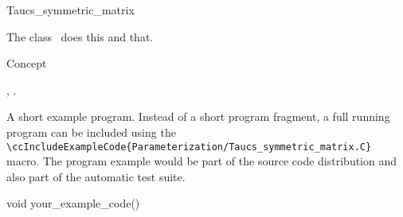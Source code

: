 

\begin{ccRefClass}{Taucs_symmetric_matrix}  %


\ccDefinition
  
The class \ccRefName\ does this and that.


\ccIsModel

Concept

\ccTypes


\ccCreation
{}  %


\ccOperations


\ccSeeAlso

,
.

\ccExample

A short example program.
Instead of a short program fragment, a full running program can be
included using the 
\verb|\ccIncludeExampleCode{Parameterization/Taucs_symmetric_matrix.C}| 
macro. The program example would be part of the source code distribution and
also part of the automatic test suite.

\begin{ccExampleCode}
void your_example_code() {
}
\end{ccExampleCode}


\end{ccRefClass}


